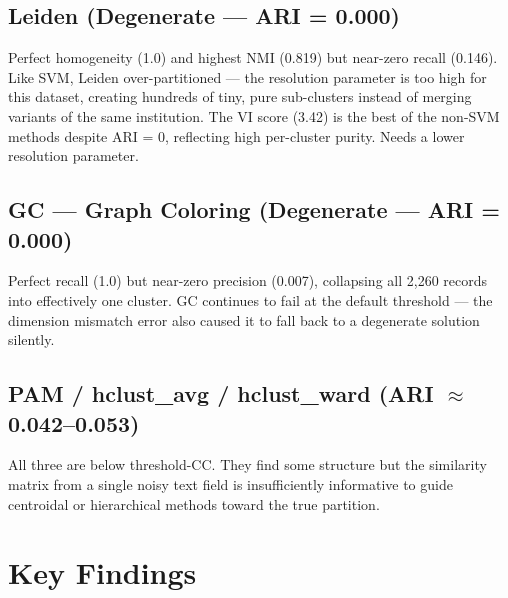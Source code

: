 \documentclass[11pt, a4paper]{article}
\begin{document}
\subsection*{Leiden (Degenerate --- ARI = 0.000)}
Perfect homogeneity (1.0) and highest NMI (0.819) but near-zero recall (0.146). Like SVM,
Leiden over-partitioned --- the resolution parameter is too high for this dataset, creating
hundreds of tiny, pure sub-clusters instead of merging variants of the same institution.
The VI score (3.42) is the best of the non-SVM methods despite ARI = 0, reflecting high
per-cluster purity. Needs a lower resolution parameter.

\subsection*{GC --- Graph Coloring (Degenerate --- ARI = 0.000)}
Perfect recall (1.0) but near-zero precision (0.007), collapsing all 2,260 records into
effectively one cluster. GC continues to fail at the default threshold --- the dimension
mismatch error also caused it to fall back to a degenerate solution silently.

\subsection*{PAM / hclust\_avg / hclust\_ward (ARI $\approx$ 0.042--0.053)}
All three are below threshold-CC. They find some structure but the similarity matrix from a
single noisy text field is insufficiently informative to guide centroidal or hierarchical methods
toward the true partition.

\section{Key Findings}
\end{document}
